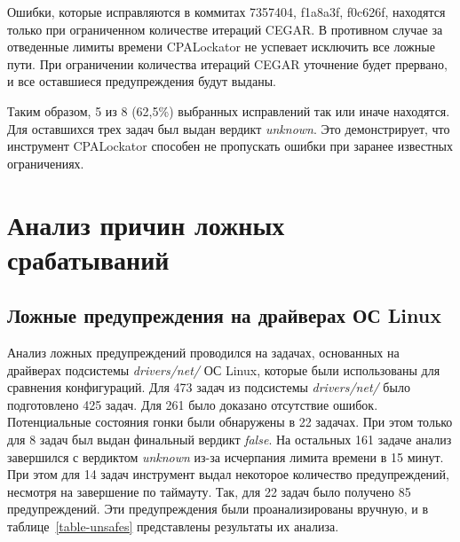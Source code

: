 Ошибки, которые исправляются в коммитах 7357404, f1a8a3f, f0c626f, находятся только при ограниченном количестве итераций CEGAR.
В противном случае за отведенные лимиты времени CPALockator не успевает исключить все ложные пути. 
При ограничении количества итераций CEGAR уточнение будет прервано, и все оставшиеся предупреждения будут выданы.


Таким образом, 5 из 8 (62,5\%) выбранных исправлений так или иначе находятся.
Для оставшихся трех задач был выдан вердикт \textit{unknown}.
Это демонстрирует, что инструмент CPALockator способен не пропускать ошибки при заранее известных ограничениях.

\section{Анализ причин ложных срабатываний}

\subsection{Ложные предупреждения на драйверах ОС Linux}

Анализ ложных предупреждений проводился на задачах, основанных на драйверах подсистемы \textit{drivers/net/} ОС Linux, которые были использованы для сравнения конфигураций.
Для 473 задач из подсистемы \textit{drivers/net/} было подготовлено 425 задач.
Для 261 было доказано отсутствие ошибок.
Потенциальные состояния гонки были обнаружены в 22 задачах.
При этом только для 8 задач был выдан финальный вердикт \textit{false}.
На остальных 161 задаче анализ завершился с вердиктом \textit{unknown} из-за исчерпания лимита времени в 15 минут.
При этом для 14 задач инструмент выдал некоторое количество предупреждений, несмотря на завершение по таймауту.
Так, для 22 задач было получено 85 предупреждений. 
Эти предупреждения были проанализированы вручную, и в таблице~\ref{table-unsafes} представлены результаты их анализа.

